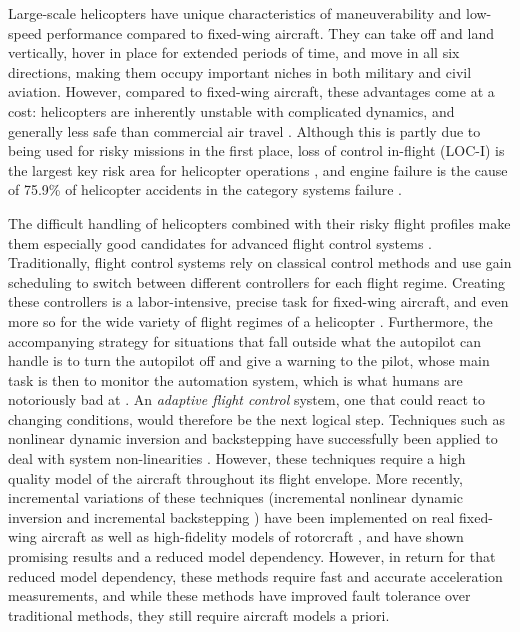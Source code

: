 Large-scale helicopters have unique characteristics of maneuverability and low-speed performance compared to fixed-wing aircraft. They can take off and land vertically, hover in place for extended periods of time, and move in all six directions, making them occupy important niches in both military and civil aviation. However, compared to fixed-wing aircraft, these advantages come at a cost: helicopters are inherently unstable with complicated dynamics, and generally less safe than commercial air travel \cite{IHST}. Although this is partly due to being used for risky missions in the first place, loss of control in-flight (LOC-I) is the largest key risk area for helicopter operations \cite{EASA}, and engine failure is the cause of 75.9\% of helicopter accidents in the category systems failure \cite{IHST}. 

The difficult handling of helicopters combined with their risky flight profiles make them especially good candidates for advanced flight control systems \cite{Hu2017}. Traditionally, flight control systems rely on classical control methods and use gain scheduling to switch between different controllers for each flight regime. Creating these controllers is a labor-intensive, precise task for fixed-wing aircraft, and even more so for the wide variety of flight regimes of a helicopter \cite{Hu2017}. Furthermore, the accompanying strategy for situations that fall outside what the autopilot can handle is to turn the autopilot off and give a warning to the pilot, whose main task is then to monitor the automation system, which is what humans are notoriously bad at \cite{ironies}. An \emph{adaptive flight control} system, one that could react to changing conditions, would therefore be the next logical step. Techniques such as nonlinear dynamic inversion and backstepping have successfully been applied to deal with system non-linearities \cite{NDI, BS}. However, these techniques require a high quality model of the aircraft throughout its flight envelope. More recently, incremental variations of these techniques (incremental nonlinear dynamic inversion \cite{INDI} and incremental backstepping \cite{IBS}) have been implemented on real fixed-wing aircraft \cite{Pollack2019, Keijzer2019} as well as high-fidelity models of rotorcraft \cite{Simplicio2013}, and have shown promising results and a reduced model dependency. However, in return for that reduced model dependency, these methods require fast and accurate acceleration measurements, and while these methods have improved fault tolerance over traditional methods, they still require aircraft models a priori. 

